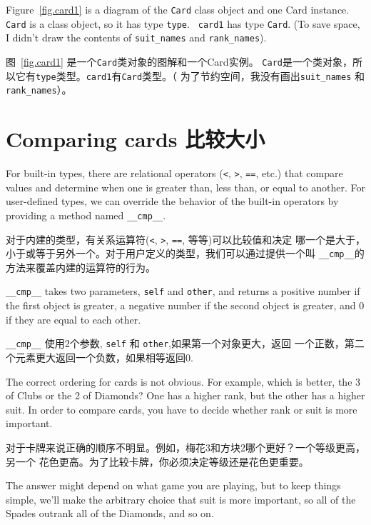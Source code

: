 \documentclass[10pt]{book}
\begin{document}
\begin{CJK}{UTF8}{gbsn}
Figure~\ref{fig.card1} is a diagram of the {\tt Card} class object
and one Card instance.
{\tt Card} is a class object, so it has type {\tt type}.  {\tt
card1} has type {\tt Card}.  (To save space, I didn't draw the
contents of \verb"suit_names" and \verb"rank_names").

图~\ref{fig.card1} 是一个{\tt Card}类对象的图解和一个Card实例。
{\tt Card}是一个类对象，所以它有{\tt type}类型。{\tt card1}有{\tt Card}类型。（
为了节约空间，我没有画出\verb"suit_names" 和 \verb"rank_names"）。


\section{Comparing cards 比较大小}
\label{comparecard}

For built-in types, there are relational operators
({\tt <}, {\tt >}, {\tt ==}, etc.)
that compare
values and determine when one is greater than, less than, or equal to
another.  For user-defined types, we can override the behavior of
the built-in operators by providing a method named
\verb"__cmp__".  

对于内建的类型，有关系运算符({\tt <}, {\tt >}, {\tt ==}, 等等)可以比较值和决定
哪一个是大于，小于或等于另外一个。对于用户定义的类型，我们可以通过提供一个叫
\verb"__cmp__"的方法来覆盖内建的运算符的行为。

\verb"__cmp__" takes two parameters, {\tt self} and {\tt other},
and returns a positive number if the first object is greater, a
negative number if the second object is greater, and 0 if they are
equal to each other.

\verb"__cmp__" 使用2个参数, {\tt self} 和 {\tt other},如果第一个对象更大，返回
一个正数，第二个元素更大返回一个负数，如果相等返回0.

The correct ordering for cards is not obvious.
For example, which
is better, the 3 of Clubs or the 2 of Diamonds?  One has a higher
rank, but the other has a higher suit.  In order to compare
cards, you have to decide whether rank or suit is more important.

对于卡牌来说正确的顺序不明显。例如，梅花3和方块2哪个更好？一个等级更高，另一个
花色更高。为了比较卡牌，你必须决定等级还是花色更重要。

The answer might depend on what game you are playing, but to keep
things simple, we'll make the arbitrary choice that suit is more
important, so all of the Spades outrank all of the Diamonds,
and so on.


\end{CJK}
\end{document}
